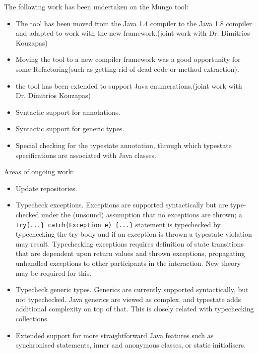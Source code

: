 The following work has been undertaken on the Mungo tool:
\begin{itemize}
  \item The tool has been moved from the Java 1.4 compiler to the Java 1.8 compiler and adapted to work with the new framework.(joint work with Dr. Dimitrios Kouzapas)
  \item Moving the tool to a new compiler framework was a good opportunity for some Refactoring(such as getting rid of dead code or method extraction).
  \item the tool has been extended to support Java enumerations.(joint work with Dr. Dimitrios Kouzapas)
  \item Syntactic support  for annotations.
  \item Syntactic support for generic types.
  \item Special checking for the typestate annotation, through which typestate
specifications are associated with Java classes.
\end{itemize}

Areas of ongoing work:
\begin{itemize}
\item Update repositories.
\item Typecheck exceptions.
Exceptions are supported syntactically but are type-checked under
the (unsound) assumption that no exceptions are thrown;
a \lstinline|try{...} catch(Exception e) {...}| statement is typechecked by
typechecking the try body and if an exception is thrown a typestate violation may result.
Typechecking exceptions requires definition of state transitions that are dependent upon return values and thrown exceptions, propagating unhandled exceptions to other participants in the interaction. New theory may be required for this.


\item Typecheck generic types.
Generics are currently supported syntactically, but not typechecked. Java generics are viewed as complex, and typestate adds additional complexity on top of that. This is closely related with typechecking collections.

\item Extended support for more straightforward Java features such as synchronised statements, inner and anonymous classes, or static initialisers.
\end{itemize}

